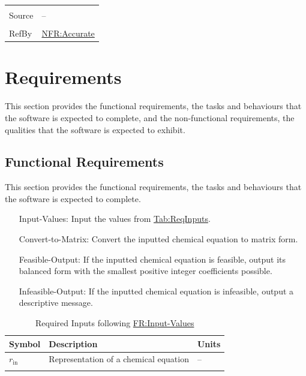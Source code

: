 \documentclass[12pt]{article}
\begin{document}
\begin{minipage}{\textwidth}
\begin{tabular}{>{\raggedright}p{}>{\raggedright\arraybackslash}p{}}
\\ \midrule \\
Source & --
         
\\ \midrule \\
RefBy & \hyperref[accurate]{NFR:Accurate}
        
\\ \bottomrule
\end{tabular}
\end{minipage}
\section{Requirements}
\label{Sec:Requirements}
This section provides the functional requirements, the tasks and behaviours that the software is expected to complete, and the non-functional requirements, the qualities that the software is expected to exhibit.

\subsection{Functional Requirements}
\label{Sec:FRs}
This section provides the functional requirements, the tasks and behaviours that the software is expected to complete.

\begin{itemize}
\item[Input-Values:\phantomsection\label{inputValues}]{Input the values from \hyperref[Table:ReqInputs]{Tab:ReqInputs}.}
\item[Convert-to-Matrix:\phantomsection\label{convertMatrix}]{Convert the inputted chemical equation to matrix form.}
\item[Feasible-Output:\phantomsection\label{feasOut}]{If the inputted chemical equation is feasible, output its balanced form with the smallest positive integer coefficients possible.}
\item[Infeasible-Output:\phantomsection\label{infeasOut}]{If the inputted chemical equation is infeasible, output a descriptive message.}
\end{itemize}
\begin{longtable}{l l l}
\toprule
\textbf{Symbol} & \textbf{Description} & \textbf{Units}
\\
\midrule
\endhead
${r_{\text{in}}}$ & Representation of a chemical equation & --
\\
\bottomrule
\caption{Required Inputs following \hyperref[inputValues]{FR:Input-Values}}
\label{Table:ReqInputs}
\end{longtable}
\end{document}
